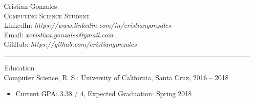 \documentclass{res}
\begin{document}
\begin{resume}

{\Huge Cristian Gonzales}\\
\textsc{\large Computing Science Student}\\
LinkedIn: \textit{https://www.linkedin.com/in/cristiangonzales}\\
Email: \textit{xcristian.gonzales@gmail.com}\\
GitHub: \textit{https://github.com/cristiangonzales}\\

\hrule

{\LARGE Education}\\
{\Large Computer Science, B. S.: University of California, Santa Cruz, 2016 -- 2018}
\begin{itemize}
\item Current GPA: 3.38 / 4, Expected Graduation: Spring 2018
\end{itemize}

\end{resume}
\end{document}
